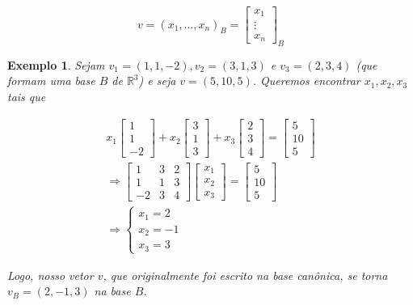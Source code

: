\documentclass{article}
\newtheorem*{example}{Exemplo}
\begin{document}
\begin{equation*}
v = (x_1, \dots, x_n)_B = \begin{bmatrix}
x_1\\
\vdots\\
x_n
\end{bmatrix}_B
\end{equation*}

\begin{example}
	Sejam $v_1 = (1, 1, -2), v_2 = (3, 1, 3)$ e $v_3 = (2, 3, 4)$ (que formam uma base $B$ de $\mathbb{R}^3$) e seja $v = (5, 10, 5)$. Queremos encontrar $x_1, x_2, x_3$ tais que 
	
	\begin{align*}
	x_1\begin{bmatrix}
	1\\
	1\\
	-2
	\end{bmatrix} + x_2\begin{bmatrix}
	3\\
	1\\
	3
	\end{bmatrix} + x_3\begin{bmatrix}
	2\\
	3\\
	4
	\end{bmatrix} = \begin{bmatrix}
	5\\
	10\\
	5
	\end{bmatrix} \\
	\Rightarrow \begin{bmatrix}
	1 & 3 & 2 \\
	1 & 1 & 3 \\
	-2 & 3 & 4
	\end{bmatrix}\begin{bmatrix}
	x_1\\
	x_2\\
	x_3
	\end{bmatrix} = \begin{bmatrix}
	5\\
	10\\
	5
	\end{bmatrix} \\
	\Rightarrow \begin{cases}
	x_1 = 2\\
	x_2 = -1\\
	x_3 = 3
	\end{cases}
	\end{align*}
	
	\par\vspace{0.3cm} Logo, nosso vetor $v$, que originalmente foi escrito na base canônica, se torna $v_B = (2, -1, 3)$ na base $B$.	
	
\end{example}
\end{document}
